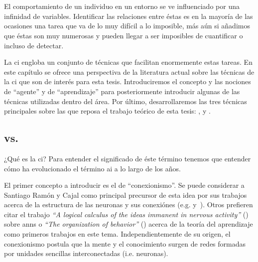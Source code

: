 \chapter{}
\label{ch:sota-ci}

El comportamiento de un individuo en un entorno se ve influenciado por una infinidad de variables. Identificar las relaciones entre éstas es en la mayoría de las ocasiones una tarea que va de lo muy difícil a lo imposible, más aún si añadimos que éstas son muy numerosas y pueden llegar a ser imposibles de cuantificar o incluso de detectar.

La \ac{ci} engloba un conjunto de técnicas que facilitan enormemente estas tareas. En este capítulo se ofrece una perspectiva de la literatura actual sobre las técnicas de la \gls{ci} que son de interés para esta tesis. Introduciremos el concepto y las nociones de \enquote{agente} y de \enquote{aprendizaje} para posteriormente introducir algunas de las técnicas utilizadas dentro del área. Por último, desarrollaremos las tres técnicas principales sobre las que reposa el trabajo teórico de esta tesis: ,  y .

\section{ vs. }

¿Qué es la \ac{ci}? Para entender el significado de éste término tenemos que entender cómo ha evolucionado el término \ac{ai} a lo largo de los años.

El primer concepto a introducir es el de \enquote{conexionismo}. Se puede considerar a Santiago Ramón y Cajal como principal precursor de esta idea por sus trabajos acerca de la estructura de las neuronas y sus conexiónes (e.g. \cite{y1888estructura} y~\cite{ramon1904textura}). Otros prefieren citar el trabajo \textit{\enquote{A logical calculus of the ideas immanent in nervous activity}} (\cite{McCulloch1943}) sobre \glspl{ann} o \textit{\enquote{The organization of behavior}} (\cite{hebb19680}) acerca de la teoría del aprendizaje como primeros trabajos en este tema. Independientemente de su origen, el conexionismo postula que la mente y el conocimiento surgen de redes formadas por unidades sencillas interconectadas (i.e. neuronas).


